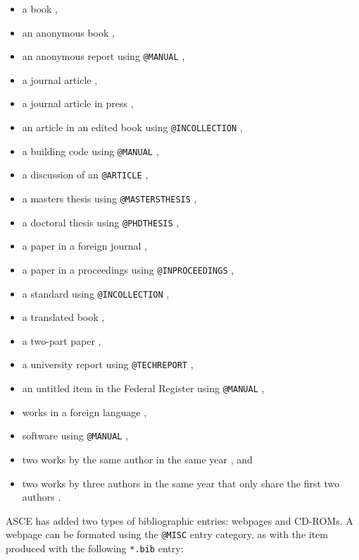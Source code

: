 \documentclass[Journal,LineNumbers]{ascelike-new}
\begin{document}
\begin{itemize}
\item
  a book \citep{Goossens:1994a},
\item
  an anonymous book \citep{Moody:1988a},
\item
  an anonymous report using \texttt{@MANUAL} \citep{FHWA:1991a},
\item
  a journal article \citep{Stahl:2004a, Pennoni:1992a},
\item
  a journal article in press \citep{Dasgupta:2008a},
\item
  an article in an edited book using \texttt{@INCOLLECTION}
  \citep{Zadeh:1981a},
\item
  a building code using \texttt{@MANUAL} \citep{ICBO:1988a},
\item
  a discussion of an \texttt{@ARTICLE} \citep{Vesilind:1992a},
\item
  a masters thesis using \texttt{@MASTERSTHESIS}
  \citep{Sotiropulos:1991a},
\item
  a doctoral thesis using \texttt{@PHDTHESIS} \citep{Chang:1987a},
\item
  a paper in a foreign journal \citep{Ireland:1954a},
\item
  a paper in a proceedings using \texttt{@INPROCEEDINGS}
  \citep{Eshenaur:1991a, Garrett:2003a},
\item
  a standard using \texttt{@INCOLLECTION} \citep{ASTM:1991a},
\item
  a translated book \citep{Melan:1913a},
\item
  a two-part paper \citep{Frater:1992a, Frater:1992b},
\item
  a university report using \texttt{@TECHREPORT} \citep{Duan:1990a},
\item
  an untitled item in the Federal Register using \texttt{@MANUAL}
  \citep{FR:1968a},
\item
  works in a foreign language \citep{Duvant:1972a, Reiffenstuhl:1982a},
\item
  software using \texttt{@MANUAL} \citep{Lotus:1985a},
\item
  two works by the same author in the same year
  \citep{Gaspar:2001b, Gaspar:2001a}, and
\item
  two works by three authors in the same year that only share the first
  two authors \citep{Huang2009a, Huang2009b}.
\end{itemize}

ASCE has added two types of bibliographic entries: webpages and CD-ROMs.
A webpage can be formated using the \texttt{@MISC} entry category, as
with the item \citep{Burka:1993a} produced with the following
\texttt{*.bib} entry:
\end{document}
